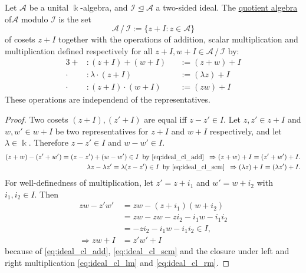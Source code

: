 \begin{remark}
Let $\mathcal{A}$ be a unital $\Bbbk$-algebra, and $\mathcal{I} \unlhd \mathcal{A}$ a two-sided ideal.
The \ul{quotient algebra} of$\mathcal{A}$ modulo $\mathcal{I}$ is the set
\[
\mathcal{A}\,/\,\mathcal{I} := \{ z + I : z \in \mathcal{A} \}
\]
of cosets $z + I$
together with the operations of addition, scalar multiplication and multiplication defined respectively for all
$z+I, w+I \in \mathcal{A}\,/\,\mathcal{I}$ by:
\begin{alignat}{3}
+ &: (z+I) + (w+I) &&:= (z+w)+I \\
\cdot &: \lambda \cdot (z+I) &&:= (\lambda z)+I \\
\cdot &: (z+I) \cdot (w+I) &&:= (zw)+I
\end{alignat}
These operations are independend of the representatives.
\end{remark}
\begin{proof}
Two cosets $(z+I), (z'+I)$ are equal iff $z-z' \in I$.
Let $z, z'\in z+I$ and $w, w' \in w+I$ be two representatives for $z+I$ and $w+I$ respectively, and let $\lambda \in \Bbbk$.
Therefore $z-z' \in I$ and $w-w' \in I$.
\begin{align}
(z+w) - (z'+w') = (z-z') + (w-w') \in I\, \text{ by \eqref{eq:ideal_cl_add} }\, \Rightarrow (z+w)+I = (z'+w')+I.\\
\lambda z - \lambda z' = \lambda(z-z') \in I\, \text{ by \eqref{eq:ideal_cl_scm} }\, \Rightarrow (\lambda z)+I = (\lambda z')+I.
\end{align}
For well-definedness of multiplication, let $z' = z + i_{1}$ and $w' = w + i_{2}$ with $i_{1}, i_{2} \in I$. Then
\begin{align}
zw - z'w' &= zw - (z+i_{1})(w+i_{2}) \\
&= zw - zw -zi_{2} -i_{1}w -i_{1}i_{2} \\
&= -zi_{2} -i_{1}w -i_{1}i_{2} \in I, \\
\Rightarrow zw+I &= z'w'+I
\end{align}
because of \eqref{eq:ideal_cl_add}, \eqref{eq:ideal_cl_scm} and the closure under left and right multiplication \eqref{eq:ideal_cl_lm} and
\eqref{eq:ideal_cl_rm}.
\end{proof}


